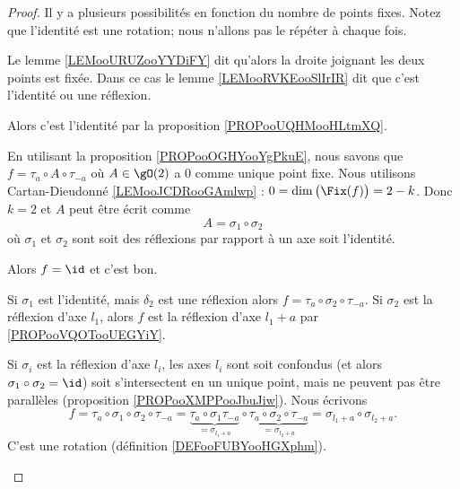 \begin{proof}
	Il y a plusieurs possibilités en fonction du nombre de points fixes. Notez que l'identité est une rotation; nous n'allons pas le répéter à chaque fois.
	\begin{subproof}
		Le lemme \ref{LEMooURUZooYYDiFY} dit qu'alors la droite joignant les deux points est fixée. Dans ce cas le lemme \ref{LEMooRVKEooSlIrIR} dit que c'est l'identité ou une réflexion.

		Alors c'est l'identité par la proposition \ref{PROPooUQHMooHLtmXQ}.

		En utilisant la proposition \ref{PROPooOGHYooYgPkuE}, nous savons que \( f=\tau_a\circ A\circ \tau_{-a}\) où \( A\in\gO(2)\) a \( 0\) comme unique point fixe. Nous utilisons Cartan-Dieudonné \ref{LEMooJCDRooGAmlwp} : \( 0=\dim\big( \Fix(f) \big)=2-k\). Donc \( k=2\) et \( A\) peut être écrit comme
		\begin{equation}
			A=\sigma_1\circ\sigma_2
		\end{equation}
		où \( \sigma_1\) et \( \sigma_2\) sont soit des réflexions par rapport à un axe soit l'identité.
		\begin{subproof}
			\spitem[Si \( \sigma_1=\sigma_2=\id\)]
			Alors \( f=\id\) et c'est bon.

			\spitem[Si \( \sigma_1=\id\) et pas \( \sigma_2\)]
			Si \( \sigma_1\) est l'identité, mais \( \delta_2\) est une réflexion alors \( f=\tau_a\circ\sigma_2\circ\tau_{-a}\). Si \( \sigma_2\) est la réflexion d'axe \( l_1\), alors \( f\) est la réflexion d'axe \( l_1+a\) par \ref{PROPooVQOTooUEGYiY}.

			Si \( \sigma_i\) est la réflexion d'axe \( l_i\), les axes \( l_i\) sont soit confondus (et alors \( \sigma_1\circ\sigma_2=\id\)) soit s'intersectent en un unique point, mais ne peuvent pas être parallèles (proposition \ref{PROPooXMPPooJbuJiw}). Nous écrivons
			\begin{equation}
				f=\tau_a\circ\sigma_1\circ\sigma_2\circ\tau_{-a}=\underbrace{\tau_a\circ\sigma_1\tau_{-a}}_{=\sigma_{l_1+a}}\circ\underbrace{\tau_a\circ\sigma_2\circ\tau_{-a}}_{=\sigma_{l_2+a}}=\sigma_{l_1+a}\circ\sigma_{l_2+a}.
			\end{equation}
			C'est une rotation (définition \ref{DEFooFUBYooHGXphm}).
		\end{subproof}
	\end{subproof}
\end{proof}

